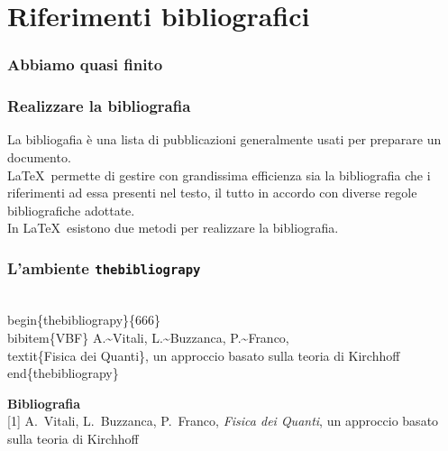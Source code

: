 \documentclass[svgnames,%
	ucs,%
	pdftex]{guitbeamer}
\begin{document}
\section{Riferimenti bibliografici}
\begin{frame}
  \frametitle{Abbiamo quasi finito}
\end{frame}
\begin{frame}
  \frametitle{Realizzare la bibliografia}
	La bibliogafia \`e una lista di pubblicazioni generalmente usati per preparare un documento. \\
  \medskip
	\LaTeX\ permette di gestire con grandissima efficienza sia la bibliografia che i riferimenti ad essa presenti nel testo, il tutto in accordo con diverse regole bibliografiche adottate.\\
  \bigskip
	In \LaTeX\ esistono due metodi per realizzare la bibliografia.
\end{frame}
\begin{frame}
  \frametitle{L'ambiente \texttt{thebibliograpy}}
	\begin{LaTeXcode}
		\alert{\\begin\{thebibliograpy\}\{666\}}\n
		\hspace*{5ex}\\bibitem\{VBF\}\n
		\hspace*{5ex}A.\textasciitilde Vitali, L.\textasciitilde Buzzanca, P.\textasciitilde Franco,\n
		\hspace*{5ex}\\textit\{Fisica dei Quanti\},\n
		\hspace*{5ex}un approccio basato sulla teoria di Kirchhoff\n
		\alert{\\end\{thebibliograpy\}}
	\end{LaTeXcode}
	\begin{LaTeXoutput}
		\textbf{\Large Bibliografia}\\[2ex]
		[1] A.~Vitali, L.~Buzzanca, P.~Franco, \textit{Fisica dei Quanti}, un approccio basato sulla teoria di Kirchhoff
	\end{LaTeXoutput}
\end{frame}
\end{document}
